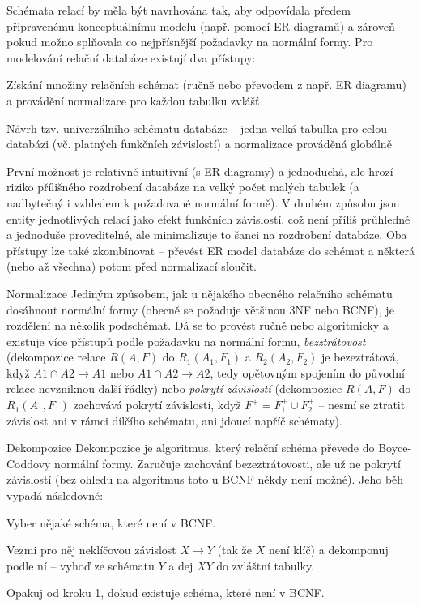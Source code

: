 Schémata relací by měla být navrhována tak, aby odpovídala předem připravenému konceptuálnímu modelu (např. pomocí ER diagramů) a zároveň pokud možno splňovala co nejpřísnější požadavky na normální formy. Pro modelování relační databáze existují dva přístupy:
\begin{penumerate}
    \item Získání množiny relačních schémat (ručně nebo převodem z např. ER diagramu) a provádění normalizace pro každou tabulku zvlášť
    \item Návrh tzv. univerzálního schématu databáze -- jedna velká tabulka pro celou databázi (vč. platných funkčních závislostí) a normalizace prováděná globálně
\end{penumerate}
První možnost je relativně intuitivní (s ER diagramy) a jednoduchá, ale hrozí riziko přílišného rozdrobení databáze na velký počet malých tabulek (a nadbytečný i vzhledem k požadované normální formě). V druhém způsobu jsou entity jednotlivých relací  jako efekt funkčních závislostí, což není příliš průhledné a jednoduše proveditelné, ale minimalizuje to šanci na rozdrobení databáze. Oba přístupy lze také zkombinovat -- převést ER model databáze do schémat a některá (nebo až všechna) potom před normalizací sloučit.

\begin{obecne}{Normalizace}
Jediným způsobem, jak u nějakého obecného relačního schématu dosáhnout normální formy (obecně se požaduje většinou 3NF nebo BCNF), je rozdělení na několik podschémat. Dá se to provést ručně nebo algoritmicky a existuje více přístupů podle požadavku na normální formu, \emph{bezztrátovost} (dekompozice relace $R( A, F )$ do $R_1(A_1,F_1)$ a $R_2(A_2,F_2)$ je bezeztrátová, když $A1 \cap A2\to A1$ nebo $A1 \cap A2 \to A2$, tedy opětovným spojením do původní relace nevzniknou další řádky) nebo \emph{pokrytí závislostí} (dekompozice $R(A,F)$ do $R_1(A_1,F_1)$ zachovává pokrytí závislostí, když $F^{+}=F^{+}_1\cup F^{+}_2$ -- nesmí se ztratit závislost ani v rámci dílčího schématu, ani jdoucí napříč schématy).
\end{obecne}

\begin{algoritmusN}{Dekompozice}
Dekompozice je algoritmus, který relační schéma převede do Boyce-Coddovy normální formy. Zaručuje zachování bezeztrátovosti, ale už ne pokrytí závislostí (bez ohledu na algoritmus toto u BCNF někdy není možné). Jeho běh vypadá následovně:
\begin{penumerate}
    \item Vyber nějaké schéma, které není v BCNF.
    \item Vezmi pro něj neklíčovou závislost $X\to Y$ (tak že $X$ není klíč) a dekomponuj podle ní -- vyhoď ze schématu $Y$ a dej $XY$ do zvláštní tabulky.
    \item Opakuj od kroku 1, dokud existuje schéma, které není v BCNF.
\end{penumerate}
\end{algoritmusN}

